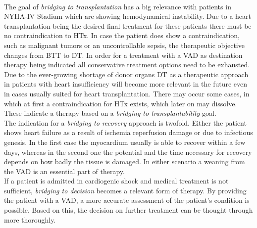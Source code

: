 \\The goal of \textit{bridging to transplantation} has a big relevance with patients in NYHA-IV Stadium which are showing hemodynamical instability. Due to a heart transplantation being the desired final treatment for these patients there must be no contraindication to HTx. In case the patient does show a contraindication, such as malignant tumors or an uncontrollable sepsis, the therapeutic objective changes from BTT to DT. In order for a treatment with a VAD as destination therapy being indicated all conservative treatment options need to be exhausted. Due to the ever-growing shortage of donor organs DT as a therapeutic approach in patients with heart insufficiency will become more relevant in the future even in cases usually suited for heart transplantation. \cite{VAD7} There may occur some cases, in which at first a contraindication for HTx exists, which later on may dissolve. These indicate a therapy based on a \textit{bridging to transplantability} goal. \cite{VAD6}
\\The indication for a \textit{bridging to recovery} approach is twofold. Either the patient shows heart failure as a result of ischemia reperfusion damage or due to infectious genesis. In the first case the myocardium usually is able to recover within a few days, whereas in the second one the potential and the time necessary for recovery depends on how badly the tissue is damaged. In either scenario a weaning from the VAD is an essential part of therapy. \cite{VAD7}
\\If a patient is admitted in cardiogenic shock and medical treatment is not sufficient, \textit{bridging to decision} becomes a relevant form of therapy. By providing the patient with a VAD, a more accurate assessment of the patient's condition is possible.
Based on this, the decision on further treatment can be thought through more thoroughly. \cite{VAD6}

